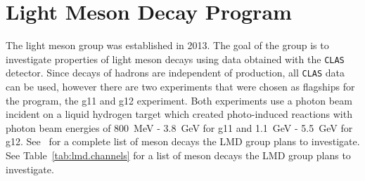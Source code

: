 \documentclass[epj]{webofc}
\begin{document}
\section{Light Meson Decay Program}
The light meson group was established in 2013. The goal of the group is to investigate properties of light meson decays using data obtained with the \textsc{\texttt{CLAS}} detector.
Since decays of hadrons are independent of production, all \textsc{\texttt{CLAS}} data can be used, however there are two experiments that were chosen as flagships for the program, the g11 and g12 experiment. Both experiments use a photon beam incident on a liquid hydrogen target which created photo-induced reactions with photon beam energies of 800~MeV - 3.8~GeV for g11 and 1.1~GeV - 5.5~GeV for g12.  See~\cite{lmdCAA} for a complete list of meson decays the LMD group plans to investigate. See Table~\ref{tab:lmd.channels} for a list of meson decays the LMD group plans to investigate.

\end{document}
